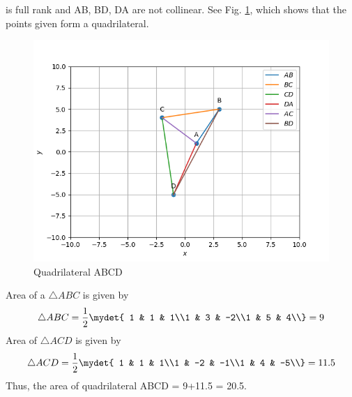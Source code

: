 is full rank and  AB, BD, DA are not collinear.
See Fig. \ref{hem/2/9/1/fig:Quad ABCD}, which shows that the points given form a quadrilateral.
\begin{figure}[!ht]
    \centering
    \includegraphics[width=\columnwidth]{2/solution/9/1/QUAD.png}
    \caption{Quadrilateral ABCD}
    \label{hem/2/9/1/fig:Quad ABCD}
\end{figure}
%
Area of a $\triangle ABC$ is given by
%
\begin{align}
\triangle ABC = 
\frac{1}{2}\mydet{
1 & 1 & 1\\1 & 3 & -2\\1 & 5 & 4\\}
= 9
\end{align}
%
Area of $\triangle ACD$  is given by
\begin{align}
\triangle ACD = 
\frac{1}{2}\mydet{
1 & 1 & 1\\1 & -2 & -1\\1 & 4 & -5\\}
= 11.5
\end{align}
Thus, the area of quadrilateral ABCD = 9+11.5 = 20.5.
